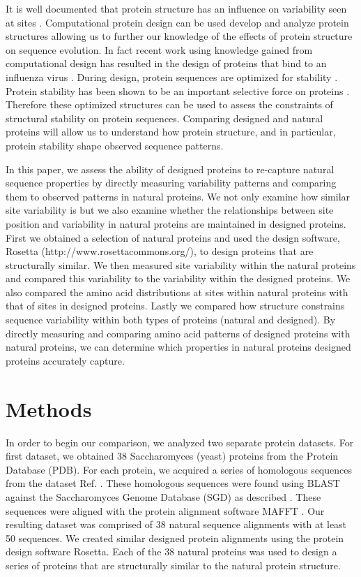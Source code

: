 \documentclass[12pt]{article}
\begin{document}
\par It is well documented that protein structure has an influence on variability seen at sites \cite{Franzosa2009, Ramsey2011}. Computational protein design can be used develop and analyze protein structures allowing us to further our knowledge of the effects of protein structure on sequence evolution. In fact recent work using knowledge gained from computational design has resulted in the design of proteins that bind to an influenza virus \cite{Fleishman2011}. During design, protein sequences are optimized for stability \cite{Butterfoss2006, Das2008}. Protein stability has been shown to be an important selective force on proteins \cite{Drummond2008}. Therefore these optimized structures can be used to assess the constraints of structural stability on protein sequences. Comparing designed and natural proteins will allow us to understand how protein structure, and in particular, protein stability shape observed sequence patterns.

\par In this paper, we assess the ability of designed proteins to re-capture natural sequence properties by directly measuring variability patterns and comparing them to observed patterns in natural proteins. We not only examine how similar site variability is but we also examine whether the relationships between site position and variability in natural proteins are maintained in designed proteins.  First we obtained a selection of natural proteins and used the design software, Rosetta (http://www.rosettacommons.org/), to design proteins that are structurally similar. We then measured site variability within the natural proteins and compared this variability to the variability within the designed proteins. We also compared the amino acid distributions at sites within natural proteins with that of sites in designed proteins. Lastly we compared how structure constrains sequence variability within both types of proteins (natural and designed). By directly measuring and comparing amino acid patterns of designed proteins with natural proteins, we can determine which properties in natural proteins designed proteins accurately capture. 

\section{Methods}
\label{Methods}

\par In order to begin our comparison, we analyzed two separate protein datasets. For first dataset, we obtained 38 Saccharomyces (yeast) proteins from the Protein Database (PDB).  For each protein, we acquired a series of homologous sequences from the dataset Ref. \cite{Ramsey2011}. These homologous sequences were found using BLAST against the Saccharomyces Genome Database (SGD) as described \cite{Ramsey2011}. These sequences were aligned with the protein alignment software MAFFT \cite{Katoh2002}. Our resulting dataset was comprised of 38 natural sequence alignments with at least 50 sequences. We created similar designed protein alignments using the protein design software Rosetta. Each of the 38 natural proteins was used to design a series of proteins that are structurally similar to the natural protein structure.
\end{document}
